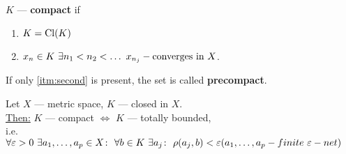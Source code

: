 \begin{defn}
  $K$ --- \textbf{compact} if
  \begin{enumerate}
    \item $K = \operatorname{Cl}({K})$
    \item \label{itm:second}$x_n \in K\ \exists n_1 < n_2 < \dotso\ x_{n_j} - \textnormal{converges in $X$}$.
  \end{enumerate}
  If only \ref{itm:second} is present, the set is called \textbf{precompact}.
\end{defn}
\begin{thm}[Hausdorff]
  Let $X$ --- metric space, $K$ --- closed in $X$. \\
  \underline{Then:} $K$ --- compact $\iff$ $K$ --- totally bounded, \\
  i.e. $\forall \epsilon > 0\ \exists a_1,\dotsc, a_p \in X \colon\ \forall b \in K\ \exists a_j \colon\ \rho(a_j, b) < \epsilon \\
  (a_1, \dotsc, a_p - finite\ \epsilon-net)$
\end{thm}
